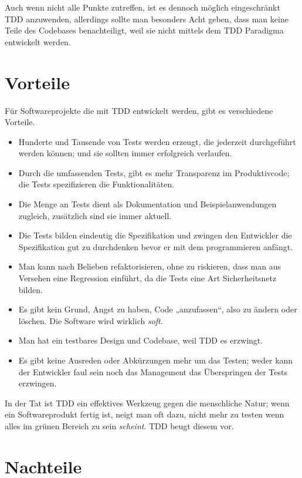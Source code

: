 \documentclass{mitschrift}
\begin{document}
Auch wenn nicht alle Punkte zutreffen, ist es dennoch möglich eingeschränkt TDD
anzuwenden, allerdings sollte man besonders Acht geben, dass man keine Teile
des Codebases benachteiligt, weil sie nicht mittels dem TDD Paradigma
entwickelt werden.

\section{Vorteile}\label{sec:Vorteile}

Für Softwareprojekte die mit TDD entwickelt werden, gibt es verschiedene
Vorteile.

\begin{itemize}
    \item Hunderte und Tausende von Tests werden erzeugt, die jederzeit
        durchgeführt werden können; und sie sollten immer erfolgreich
        verlaufen.
    \item Durch die umfassenden Tests, gibt es mehr Transparenz im
        Produktivcode; die Tests spezifizieren die Funktionalitäten.
    \item Die Menge an Tests dient als Dokumentation und Beispielanwendungen
        zugleich, zusätzlich sind sie immer aktuell.
    \item Die Tests bilden eindeutig die Spezifikation und zwingen den
        Entwickler die Spezifikation gut zu durchdenken bevor er mit dem
        programmieren anfängt.
    \item Man kann nach Belieben refaktorisieren, ohne zu riskieren, dass man
        aus Versehen eine Regression einführt, da die Tests eine Art
        Sicherheitsnetz bilden.
    \item Es gibt kein Grund, Angst zu haben, Code „anzufassen“, also zu ändern
        oder löschen. Die Software wird wirklich \emph{soft}. \cite{UncleBob}
    \item Man hat ein testbares Design und Codebase, weil TDD es erzwingt.
    \item Es gibt keine Ausreden oder Abkürzungen mehr um das Testen; weder
        kann der Entwickler faul sein noch das Management das Überspringen der
        Tests erzwingen.
\end{itemize}

In der Tat ist TDD ein effektives Werkzeug gegen die menschliche Natur; wenn
ein Softwareprodukt fertig ist, neigt man oft dazu, nicht mehr zu testen wenn
alles im grünen Bereich zu sein \emph{scheint}. TDD beugt diesem vor.

\section{Nachteile}\label{sec:Nachteile}
\end{document}
